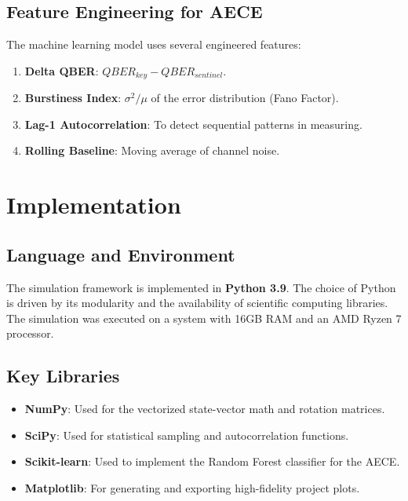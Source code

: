 \documentclass[journal,onecolumn,12pt,draftclsnofoot]{IEEEtran}
\begin{document}
\subsection{Feature Engineering for AECE}
The machine learning model uses several engineered features:
\begin{enumerate}
    \item \textbf{Delta QBER}: $QBER_{key} - QBER_{sentinel}$.
    \item \textbf{Burstiness Index}: $\sigma^2/\mu$ of the error distribution (Fano Factor).
    \item \textbf{Lag-1 Autocorrelation}: To detect sequential patterns in measuring.
    \item \textbf{Rolling Baseline}: Moving average of channel noise.
\end{enumerate}

\newpage

\section{Implementation}

\subsection{Language and Environment}
The simulation framework is implemented in \textbf{Python 3.9}. The choice of Python is driven by its modularity and the availability of scientific computing libraries. The simulation was executed on a system with 16GB RAM and an AMD Ryzen 7 processor.

\subsection{Key Libraries}
\begin{itemize}
    \item \textbf{NumPy}: Used for the vectorized state-vector math and rotation matrices.
    \item \textbf{SciPy}: Used for statistical sampling and autocorrelation functions.
    \item \textbf{Scikit-learn}: Used to implement the Random Forest classifier for the AECE.
    \item \textbf{Matplotlib}: For generating and exporting high-fidelity project plots.
\end{itemize}
\end{document}
